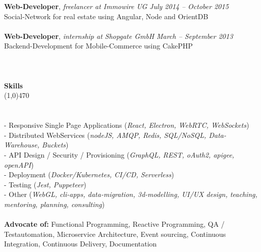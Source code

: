 \documentclass[10pt]{article} %
\begin{document}
\noindent
{\bf Web-Developer}, \textit{freelancer at Immowire UG}  \hfill \textit{ July 2014 -- October 2015 } \\ 
Social-Network for real estate using Angular, Node and OrientDB\\\\
\noindent
{\bf Web-Developer}, \textit{internship at Shopgate GmbH}  \hfill \textit{ March -- September 2013 } \\ 
Backend-Development for Mobile-Commerce using CakePHP\\\\
\noindent
\\\\
{\Large \bf Skills}\\
\line(1,0){470}\\
\\\\
\noindent
- Responsive Single Page Applications (\textit{React, Electron, WebRTC, WebSockets}) \\
- Distributed WebServices (\textit{nodeJS, AMQP, Redis, SQL/NoSQL, Data-Warehouse, Buckets}) \\
- API Design / Security / Provisioning (\textit{GraphQL, REST, oAuth2, apigee, openAPI}) \\
- Deployment (\textit{Docker/Kubernetes, CI/CD, Serverless}) \\
- Testing (\textit{Jest, Puppeteer}) \\
- Other (\textit{WebGL, cli-apps, data-migration, 3d-modelling, UI/UX design, teaching, mentoring, planning, consulting}) \\\\
\noindent
{\bf Advocate of:} Functional Programming, Reactive Programming, QA / Testautomation, Microservice Architecture, Event sourcing, Continuous Integration, Continuous Delivery, Documentation \\\\\
\end{document}
